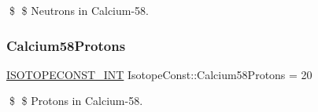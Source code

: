 \$ \$ Neutrons in Calcium-\/58. \mbox{\label{group___isotope_const-_calcium-_ca58_ga3ad906ca9fd2ae2f1d244ca2e9452abb}} 
\subsubsection{\texorpdfstring{Calcium58\+Protons}{Calcium58Protons}}
{\footnotesize\ttfamily \mbox{\hyperlink{group___isotope_const-_macros_ga5f18360b3e99483a35c32d789e62621c}{I\+S\+O\+T\+O\+P\+E\+C\+O\+N\+S\+T\+\_\+\+I\+NT}} Isotope\+Const\+::\+Calcium58\+Protons = 20}

\$ \$ Protons in Calcium-\/58. 